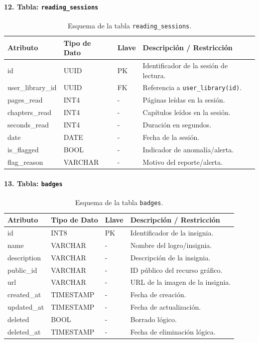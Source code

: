 \documentclass[12pt, atypical, journal]{article}
\begin{document}
\paragraph{12. Tabla: \texttt{reading\_sessions}}
\begin{table}[H]
	\centering
	\begin{tabular}{|l|l|l|p{6.5cm}|}
		\hline
		\textbf{Atributo} & \textbf{Tipo de Dato} & \textbf{Llave} & \textbf{Descripción / Restricción} \\ \hline
		id & UUID & PK & Identificador de la sesión de lectura. \\ \hline
		user\_library\_id & UUID & FK & Referencia a \texttt{user\_library(id)}. \\ \hline
		pages\_read & INT4 & - & Páginas leídas en la sesión. \\ \hline
		chapters\_read & INT4 & - & Capítulos leídos en la sesión. \\ \hline
		seconds\_read & INT4 & - & Duración en segundos. \\ \hline
		date & DATE & - & Fecha de la sesión. \\ \hline
		is\_flagged & BOOL & - & Indicador de anomalía/alerta. \\ \hline
		flag\_reason & VARCHAR & - & Motivo del reporte/alerta. \\ \hline
	\end{tabular}
	\caption{Esquema de la tabla \texttt{reading\_sessions}.}
\end{table}

\paragraph{13. Tabla: \texttt{badges}}
\begin{table}[H]
	\centering
	\begin{tabular}{|l|l|l|p{6.5cm}|}
		\hline
		\textbf{Atributo} & \textbf{Tipo de Dato} & \textbf{Llave} & \textbf{Descripción / Restricción} \\ \hline
		id & INT8 & PK & Identificador de la insignia. \\ \hline
		name & VARCHAR & - & Nombre del logro/insignia. \\ \hline
		description & VARCHAR & - & Descripción de la insignia. \\ \hline
		public\_id & VARCHAR & - & ID público del recurso gráfico. \\ \hline
		url & VARCHAR & - & URL de la imagen de la insignia. \\ \hline
		created\_at & TIMESTAMP & - & Fecha de creación. \\ \hline
		updated\_at & TIMESTAMP & - & Fecha de actualización. \\ \hline
		deleted & BOOL & - & Borrado lógico. \\ \hline
		deleted\_at & TIMESTAMP & - & Fecha de eliminación lógica. \\ \hline
	\end{tabular}
	\caption{Esquema de la tabla \texttt{badges}.}
\end{table}
\end{document}
